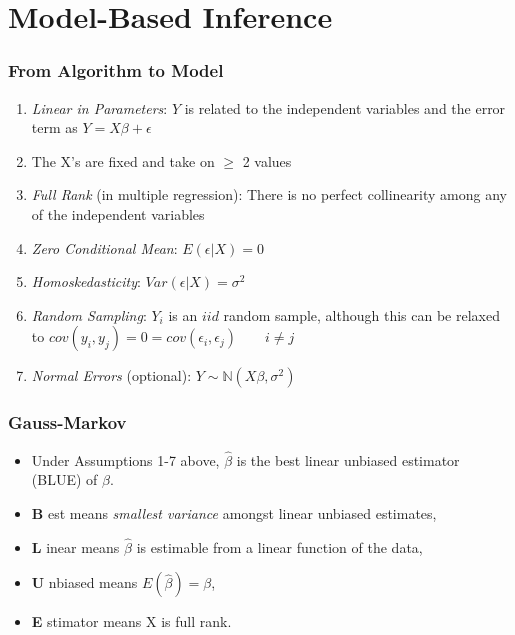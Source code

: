\documentclass{beamer}
\newcommand{\field}[1]{\mathbb{#1}}
\begin{document}
\section{Model-Based Inference}
\begin{frame}[t]\frametitle{From Algorithm to Model}
	\begin{enumerate}
	\item<+-> \emph{Linear in Parameters}: $Y$ is related to the independent variables and the error term as $Y = X\beta + \epsilon$

	\item<+-> The X's are fixed and take on $\ge$ 2 values
	\item<+-> \emph{Full Rank} (in multiple regression): There is no perfect collinearity among any of the independent variables

	\item<+-> \emph{Zero Conditional Mean}: $E(\epsilon | X ) = 0$

	\item<+-> \emph{Homoskedasticity}: $Var(\epsilon | X) = \sigma^{2}$

	\item<+-> \emph{Random Sampling}: $Y_{i}$ is an $ iid$ random sample, although this can be relaxed to $cov(y_{i}, y_{j}) = 0 = cov(\epsilon_{i}, \epsilon_{j}) \qquad i \ne j$

	\item<+-> \emph{Normal Errors} (optional): $Y \sim \field{N}( X\beta, \sigma^2 ) $
	\end{enumerate}
\end{frame}



\begin{frame}[t]\frametitle{Gauss-Markov}
	\begin{itemize}
		\item <+-> Under Assumptions 1-7 above, $\hat{\beta}$
                  is the best linear unbiased estimator (BLUE) of
                  $\beta$. 
                \item   {\bf B} est means {\em smallest variance}
                  amongst linear unbiased estimates,
		 \item  {\bf L} inear means $\hat{\beta}$ is
                   estimable from a linear function of the data,
		 \item  {\bf U} nbiased means $E(\hat{\beta})=\beta$,
		 \item  {\bf E} stimator means X is full rank.
	\end{itemize}
\end{frame}
\end{document}
